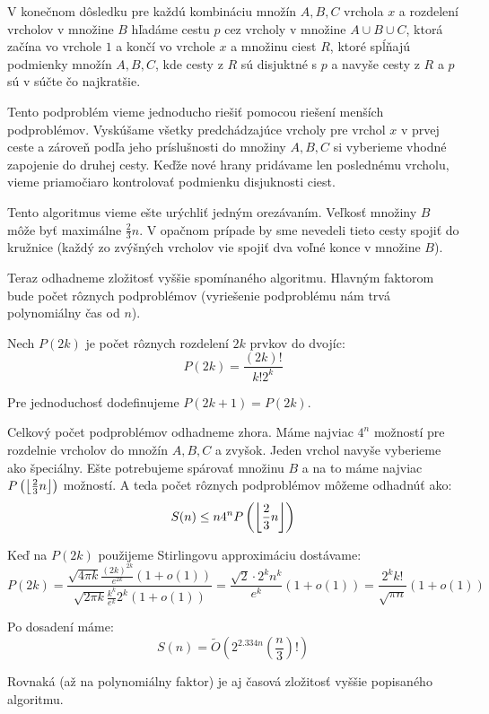 V konečnom dôsledku pre každú kombináciu množín $A, B, C$ vrchola $x$ a rozdelení
vrcholov v množine $B$ hľadáme cestu $p$ cez vrcholy v množine $A \cup B \cup C$, ktorá
začína vo vrchole $1$ a končí vo vrchole $x$ a množinu ciest $R$, ktoré
spĺňajú podmienky množín $A, B, C$, kde cesty z $R$ sú disjuktné s $p$ a navyše cesty
z $R$ a $p$ sú v súčte čo najkratšie.

Tento podproblém vieme jednoducho riešiť pomocou riešení menších podproblémov.
Vyskúšame všetky predchádzajúce vrcholy pre vrchol $x$ v prvej ceste a zároveň podľa jeho
príslušnosti do množiny $A, B, C$ si vyberieme vhodné zapojenie do druhej cesty.
Keďže nové hrany pridávame len poslednému vrcholu, vieme priamočiaro kontrolovať podmienku
disjuknosti ciest.

\bigskip

Tento algoritmus vieme ešte urýchliť jedným orezávaním. Veľkosť množiny
$B$ môže byť maximálne $\frac{2}{3}n$. V opačnom prípade by sme nevedeli tieto
cesty spojiť do kružnice (každý zo zvýšných vrcholov vie spojiť dva voľné konce
v množine $B$).

Teraz odhadneme zložitosť vyššie spomínaného algoritmu. Hlavným faktorom bude počet rôznych
podproblémov (vyriešenie podproblému nám trvá polynomiálny čas od $n$).

Nech $P(2k)$ je počet rôznych rozdelení $2k$ prvkov do dvojíc:
$$P(2k) = \frac{(2k)!}{k! 2^k}$$

Pre jednoduchosť dodefinujeme $P(2k+1) = P(2k)$.

%
%

Celkový počet podproblémov odhadneme zhora. Máme najviac $4^n$ možností pre rozdelnie
vrcholov do množín $A, B, C$ a zvyšok. Jeden vrchol navyše vyberieme ako špeciálny.
Ešte potrebujeme spárovať množinu $B$ a na to máme najviac $P\left(\floor*{\frac{2}{3}n}\right)$
možností. A teda počet rôznych podproblémov môžeme odhadnúť ako:
$$S(n) \leq n 4^n P\left(\floor*{\frac{2}{3}n}\right)$$

Keď na $P(2k)$ použijeme Stirlingovu approximáciu dostávame:
$$P(2k) = \frac{\sqrt{4\pi k}\frac{(2k)^{2k}}{e^{2k}} (1 + o(1))}
{\sqrt{2\pi k}\frac{k^{k}}{e^{k}} 2^k (1 + o(1))} =
\frac{\sqrt{2} \cdot{}2^k n^k}{e^k} (1 + o(1)) =
\frac{2^k k!}{\sqrt{\pi n}} (1 + o(1)) $$

Po dosadení máme:
$$S(n) = \tilde{O}\left(2^{2.334n} \left(\frac{n}{3}\right)!\right)$$

Rovnaká (až na polynomiálny faktor) je aj časová zložitosť vyššie popisaného algoritmu.
